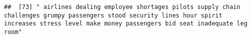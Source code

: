 \documentclass[
]{article}
\begin{document}
\begin{verbatim}
##  [73] " airlines dealing employee shortages pilots supply chain challenges grumpy passengers stood security lines hour spirit increases stress level make money passengers bid seat inadequate leg room"                                                                                                                                                                                                                                                                                                                                                                                                                                                                                                                                                                                                                                                                                                                                                                                                                                                                                                                                                                                                                                                                                                                                                                                                                                                                                                                                                                                                                                                                                                                                                                                              

\end{verbatim}
\end{document}
